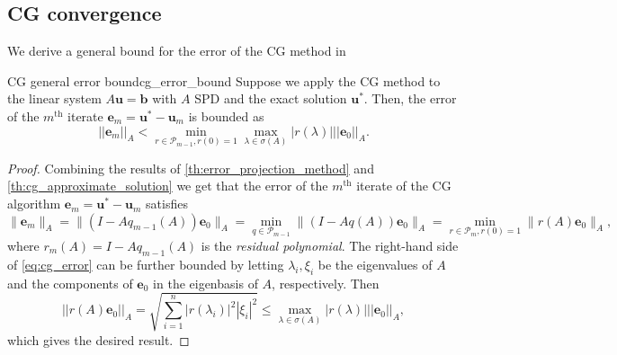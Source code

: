 \subsection{CG convergence}\label{sec:cg_convergence}
We derive a general bound for the error of the CG method in 
\begin{fancyth}{CG general error bound}{cg_error_bound}
  Suppose we apply the CG method to the linear system $A\mathbf{u} = \mathbf{b}$ with $A$ SPD and the exact solution $\mathbf{u}^*$. Then, the error of the $m^{\text{th}}$ iterate $\mathbf{e}_m = \mathbf{u}^* - \mathbf{u}_m$ is bounded as
  \begin{equation}
    ||\mathbf{e}_m||_A < \min_{r \in \mathcal{P}_{m-1}, r(0) = 1} \max_{\lambda \in \sigma(A)} |r(\lambda)| ||\mathbf{e}_0||_A.
    \label{eq:cg_error_bound}
  \end{equation}
\end{fancyth}
\begin{proof}
  Combining the results of \cref{th:error_projection_method} and \cref{th:cg_approximate_solution} we get that the error of the $m^{\text{th}}$ iterate of the CG algorithm $\mathbf{e}_m = \mathbf{u}^* - \mathbf{u}_m$ satisfies
  \begin{equation}
    \|\mathbf{e}_m\|_A = \|(I - Aq_{m-1}(A))\mathbf{e}_0\|_A = \min_{q \in \mathcal{P}_{m-1}}\|(I - Aq(A))\mathbf{e}_0\|_A = \min_{r \in \mathcal{P}_{m}, r(0) = 1}\|r(A)\mathbf{e}_0\|_A,
    \label{eq:cg_error}
  \end{equation}
  where $r_m(A) = I - Aq_{m-1}(A)$ is the \textit{residual polynomial}. The right-hand side of \cref{eq:cg_error} can be further bounded by letting $\lambda_i, \xi_i$ be the eigenvalues of $A$ and the components of $\mathbf{e}_0$ in the eigenbasis of $A$, respectively. Then
  \[
    ||r(A)\mathbf{e}_0||_A = \sqrt{\sum_{i=1}^n |r(\lambda_i)|^2 |\xi_i|^2} \leq \max_{\lambda \in \sigma(A)} |r(\lambda)| ||\mathbf{e}_0||_A,
  \]
  which gives the desired result.
\end{proof}

